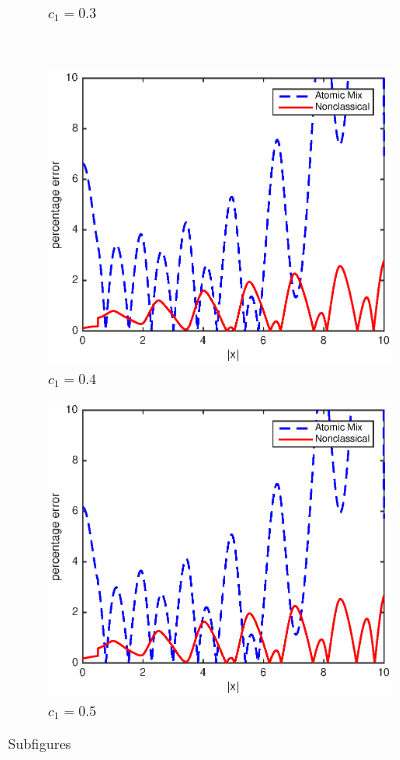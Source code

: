 \documentclass[12pt]{article}
\begin{document}
\begin{figure}[p]
\begin{subfigure}{0.495\textwidth}
        \caption{$c_1 = 0.3$}
        \label{fig1d}
    \end{subfigure}
    \\
    \centering
    \begin{subfigure}{0.495\textwidth}
        \centering
        \includegraphics[width=\textwidth]{NSE_err_A40.eps}
        \caption{$c_1 = 0.4$}
        \label{fig1e}
    \end{subfigure}
    \hfill
    \begin{subfigure}{0.495\textwidth}
        \centering
        \includegraphics[width=\textwidth]{NSE_err_A50.eps}
        \caption{$c_1 = 0.5$}
        \label{fig1f}
    \end{subfigure}
    \caption{Subfigures}
    \label{fig1}
\end{figure}
\end{document}
